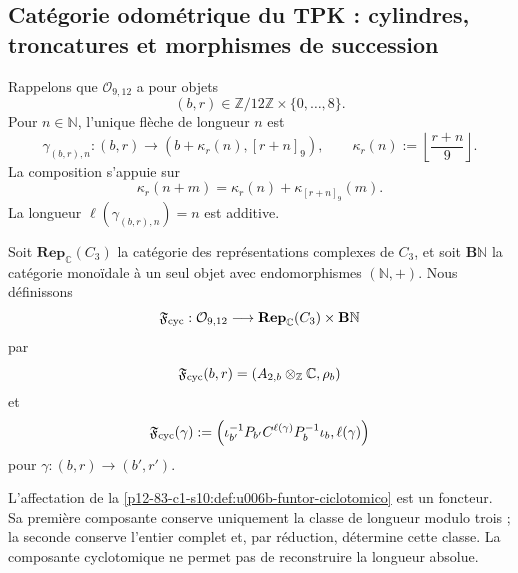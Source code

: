 {\subsection{Catégorie odométrique du TPK : cylindres, troncatures et morphismes de succession}

Rappelons que \(\mathcal O_{9,12}\) a pour objets
\[
 (b,r)\in\mathbb Z/12\mathbb Z\times\{0,\ldots,8\}.
\]
Pour \(n\in\mathbb N\), l’unique flèche de longueur \(n\) est
\begin{equation}
 \gamma_{(b,r),n}:
 (b,r)\longrightarrow
 \left(
 b+\kappa_r(n),[r+n]_9
 \right),
 \qquad
 \kappa_r(n):=
 \left\lfloor\frac{r+n}{9}\right\rfloor.
 \label{p12-83-c1-s10:eq:u006b-flecha-odometro}
\end{equation}
La composition s’appuie sur
\begin{equation}
 \kappa_r(n+m)
 =\kappa_r(n)+\kappa_{[r+n]_9}(m).
 \label{p12-83-c1-s10:eq:u006b-cociclo-odometro}
\end{equation}
La longueur \(\ell(\gamma_{(b,r),n})=n\) est additive.

\begin{definition}
\label{p12-83-c1-s10:def:u006b-funtor-ciclotomico}
Soit \(\mathbf{Rep}_{\mathbb C}(C_3)\) la catégorie des représentations
complexes de \(C_3\), et soit \(\mathbf B\mathbb N\) la catégorie monoïdale
à un seul objet avec endomorphismes \((\mathbb N,+)\). Nous définissons
\begin{equation}
 \mathfrak F_{\rm cyc}:
 \mathcal O_{9,12}
 \longrightarrow
 \mathbf{Rep}_{\mathbb C}(C_3)\times\mathbf B\mathbb N
 \label{p12-83-c1-s10:eq:u006b-signatura-funtor}
\end{equation}
par
\[
 \mathfrak F_{\rm cyc}(b,r)
 =(A_{2,b}\otimes_{\mathbb Z}\mathbb C,\rho_b)
\]
et
\begin{equation}
 \mathfrak F_{\rm cyc}(\gamma)
 :=
 \left(
 \iota_{b'}^{-1}P_{b'}C^{\ell(\gamma)}
 P_b^{-1}\iota_b,
 \ell(\gamma)
 \right)
 \label{p12-83-c1-s10:eq:u006b-flecha-funtor}
\end{equation}
pour \(\gamma:(b,r)\to(b',r')\).
\end{definition}

\begin{theorem}
\label{p12-83-c1-s10:thm:u006b-functorialidad}
L’affectation de la \cref{p12-83-c1-s10:def:u006b-funtor-ciclotomico} est un foncteur. Sa
première composante conserve uniquement la classe de longueur modulo trois ; la
seconde conserve l’entier complet et, par réduction, détermine cette classe.
La composante cyclotomique ne permet pas de reconstruire la longueur absolue.
\end{theorem}

}
